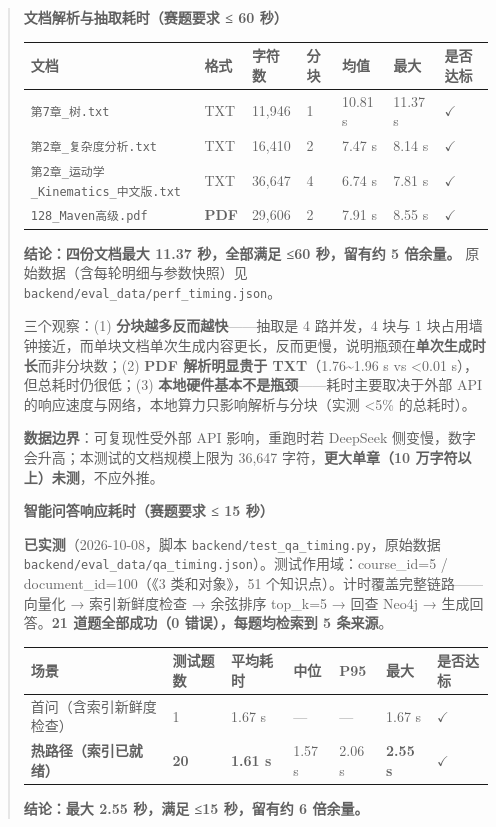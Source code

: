 \documentclass[UTF8,a4paper,11pt]{ctexrep}
\begin{document}
\begin{quote}
\small

\textbf{文档解析与抽取耗时（赛题要求 ≤ 60 秒）}\par

\begin{center}
\footnotesize
\begin{tabularx}{\linewidth}{@{}XXXXXXX@{}}
\toprule
文档 & 格式 & 字符数 & 分块 & 均值 & 最大 & 是否达标 \\
\midrule
\texttt{第7章\_树.txt} & TXT & 11,946 & 1 & 10.81 s & 11.37 s & $\checkmark$ \\
\texttt{第2章\_复杂度分析.txt} & TXT & 16,410 & 2 & 7.47 s & 8.14 s & $\checkmark$ \\
\texttt{第2章\_运动学\_Kinematics\_中文版.txt} & TXT & 36,647 & 4 & 6.74 s & 7.81 s & $\checkmark$ \\
\texttt{128\_Maven高级.pdf} & \textbf{PDF} & 29,606 & 2 & 7.91 s & 8.55 s & $\checkmark$ \\
\bottomrule
\end{tabularx}
\end{center}
\textbf{结论：四份文档最大 11.37 秒，全部满足 ≤60 秒，留有约 5 倍余量。} 原始数据（含每轮明细与参数快照）见 \texttt{backend/eval\_data/perf\_timing.json}。

三个观察：(1) \textbf{分块越多反而越快}——抽取是 4 路并发，4 块与 1 块占用墙钟接近，而单块文档单次生成内容更长，反而更慢，说明瓶颈在\textbf{单次生成时长}而非分块数；(2) \textbf{PDF 解析明显贵于 TXT}（1.76\textasciitilde{}1.96 s vs <0.01 s），但总耗时仍很低；(3) \textbf{本地硬件基本不是瓶颈}——耗时主要取决于外部 API 的响应速度与网络，本地算力只影响解析与分块（实测 <5\% 的总耗时）。

\textbf{数据边界}：可复现性受外部 API 影响，重跑时若 DeepSeek 侧变慢，数字会升高；本测试的文档规模上限为 36,647 字符，\textbf{更大单章（10 万字符以上）未测}，不应外推。


\textbf{智能问答响应耗时（赛题要求 ≤ 15 秒）}\par

\textbf{已实测}（2026-10-08，脚本 \texttt{backend/test\_qa\_timing.py}，原始数据 \texttt{backend/eval\_data/qa\_timing.json}）。测试作用域：course\_id=5 / document\_id=100（《3 类和对象》，51 个知识点）。计时覆盖完整链路——向量化 → 索引新鲜度检查 → 余弦排序 top\_k=5 → 回查 Neo4j → 生成回答。\textbf{21 道题全部成功（0 错误），每题均检索到 5 条来源}。

\begin{center}
\footnotesize
\begin{tabularx}{\linewidth}{@{}XXXXXXX@{}}
\toprule
场景 & 测试题数 & 平均耗时 & 中位 & P95 & 最大 & 是否达标 \\
\midrule
首问（含索引新鲜度检查） & 1 & 1.67 s & — & — & 1.67 s & $\checkmark$ \\
\textbf{热路径（索引已就绪）} & \textbf{20} & \textbf{1.61 s} & 1.57 s & 2.06 s & \textbf{2.55 s} & $\checkmark$ \\
\bottomrule
\end{tabularx}
\end{center}
\textbf{结论：最大 2.55 秒，满足 ≤15 秒，留有约 6 倍余量。}


\end{quote}
\end{document}
